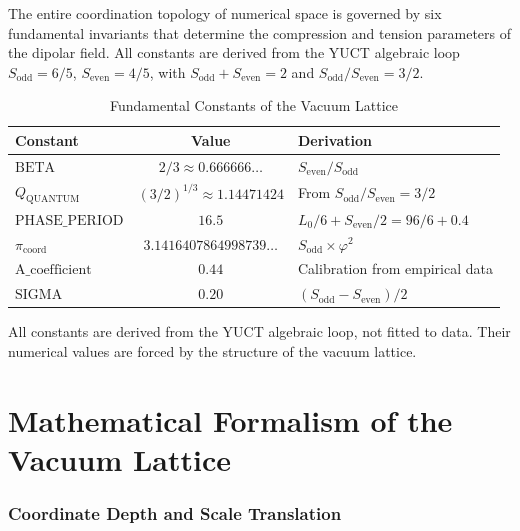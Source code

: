 \documentclass[12pt,a4paper]{article}
\newcommand{\Qquantum}{Q_{\text{QUANTUM}}}
\newcommand{\PHASE}{\text{PHASE\_PERIOD}}
\newcommand{\picoord}{\pi_{\text{coord}}}
\newcommand{\SIGMA}{\text{SIGMA}}
\newcommand{\BETA}{\text{BETA}}
\newcommand{\Acoef}{\text{A\_coefficient}}
\begin{document}
	The entire coordination topology of numerical space is governed by six fundamental invariants that determine the compression and tension parameters of the dipolar field. All constants are derived from the YUCT algebraic loop \(S_{\mathrm{odd}} = 6/5\), \(S_{\mathrm{even}} = 4/5\), with \(S_{\mathrm{odd}} + S_{\mathrm{even}} = 2\) and \(S_{\mathrm{odd}}/S_{\mathrm{even}} = 3/2\).
	
	\begin{table}[H]
		\centering
		\caption{Fundamental Constants of the Vacuum Lattice}
		\label{tab:constants}
		\begin{tabular}{l c l}
			\toprule
			\textbf{Constant} & \textbf{Value} & \textbf{Derivation} \\
			\midrule
			\(\BETA\) & \(2/3 \approx 0.666666\ldots\) & \(S_{\mathrm{even}}/S_{\mathrm{odd}}\) \\
			\(\Qquantum\) & \((3/2)^{1/3} \approx 1.14471424\) & From \(S_{\mathrm{odd}}/S_{\mathrm{even}} = 3/2\) \\
			\(\PHASE\) & \(16.5\) & \(L_0/6 + S_{\mathrm{even}}/2 = 96/6 + 0.4\) \\
			\(\picoord\) & \(3.1416407864998739\ldots\) & \(S_{\mathrm{odd}} \times \varphi^2\) \\
			\(\Acoef\) & \(0.44\) & Calibration from empirical data \\
			\(\SIGMA\) & \(0.20\) & \((S_{\mathrm{odd}} - S_{\mathrm{even}})/2\) \\
			\bottomrule
		\end{tabular}
	\end{table}
	
	\begin{verifiedbox}
		All constants are derived from the YUCT algebraic loop, not fitted to data. Their numerical values are forced by the structure of the vacuum lattice.
	\end{verifiedbox}
	
	\newpage
	
	\part{Mathematical Formalism of the Vacuum Lattice}
	
	\section{Coordinate Depth and Scale Translation}
	
\end{document}
